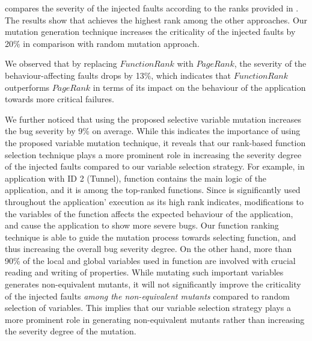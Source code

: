 compares the severity of the injected faults according to the ranks provided in . The results show that \mutandis achieves the highest rank among the other approaches. Our mutation generation technique increases the criticality of the injected faults by 20\% in comparison with random mutation approach. 
%

We observed that by replacing $FunctionRank$ with $PageRank$, the severity of the behaviour-affecting faults drops by 13\%, which indicates that $FunctionRank$ outperforms $PageRank$ in terms of its impact on the behaviour of the application towards more critical failures.
%

We further noticed that using the proposed selective variable mutation increases the bug severity by 9\% on average. While this indicates the importance of
using the proposed variable mutation technique, it reveals that our rank-based function selection technique plays a more prominent role in increasing the severity degree of the injected faults compared to our variable selection strategy.
For example, in application with ID 2 (Tunnel), function  contains the main logic of the application, and it is among the top-ranked functions.
Since  is significantly used throughout the application' execution as its high rank indicates, modifications to the variables of the function affects the expected behaviour of the application, and cause the application to show more severe bugs. Our function ranking technique is able to guide the mutation process towards selecting  function, and thus increasing the overall bug severity degree. 
On the other hand, more than 90\% of the local and global variables used in function  are involved with crucial reading and writing of properties. While mutating such important variables generates non-equivalent mutants, it will not significantly improve the criticality of the injected faults \emph{among the non-equivalent mutants} compared to random selection of variables. This implies that
our variable selection strategy plays a more prominent role in generating non-equivalent mutants rather than increasing the severity degree of the mutation.       
       
